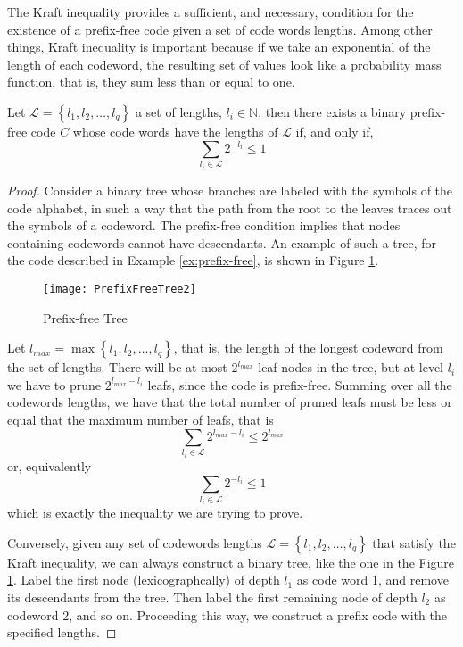 The Kraft inequality provides a sufficient, and necessary, condition for the existence of a prefix-free code given a set of code words lengths. Among other things, Kraft inequality is important because if we take an exponential of the length of each codeword, the resulting set of values look like a probability mass function, that is, they sum less than or equal to one.

\begin{theorem}
\label{th:Kraft-Inequality}
Let $\mathcal{L}=\left\{ l_{1},l_{2},\ldots,l_{q}\right\}$ a set of lengths, $l_{i}\in\mathbb{N}$, then there exists a binary prefix-free code $C$ whose code words have the lengths of $\mathcal{L}$ if, and only if,
\[
\sum_{l_{i}\in\mathcal{L}}2^{-l_{i}}\leq1
\]
\end{theorem}
\begin{proof}

Consider a binary tree whose branches are labeled with the symbols of the code alphabet, in such a way that the path from the root to the leaves traces out the symbols of a codeword. The prefix-free condition implies that nodes containing codewords cannot have descendants. An example of such a tree, for the code described in Example \ref{ex:prefix-free}, is shown in Figure \ref{fig:Prefix-Free-Tree}. 

\begin{figure}[h]
\centering\texttt{[image: PrefixFreeTree2]}
\caption{\label{fig:Prefix-Free-Tree}Prefix-free Tree}
\end{figure}

Let $l_{max}=\max \left\{ l_{1},l_{2},\ldots,l_{q}\right\}$, that is, the length of the longest codeword from the set of lengths. There will be at most $2^{l_{max}}$ leaf nodes in the tree, but at level $l_{i}$ we have to prune $2^{l_{max} - l_{i}}$ leafs, since the code is prefix-free. Summing over all the codewords lengths, we have that the total number of pruned leafs must be less or equal that the maximum number of leafs, that is
\[
\sum_{l_{i}\in\mathcal{L}}2^{l_{max}-l_{i}} \leq 2^{l_{max}}
\]
or, equivalently
\[
\sum_{l_{i}\in\mathcal{L}}2^{-l_{i}} \leq 1
\]
which is exactly the inequality we are trying to prove.

Conversely, given any set of codewords lengths $\mathcal{L}=\left\{ l_{1},l_{2},\ldots,l_{q}\right\}$ that satisfy the Kraft inequality, we can always construct a binary tree, like the one in the Figure \ref{fig:Prefix-Free-Tree}. Label the first node (lexicographcally) of depth $l_{1}$ as code word 1, and remove its descendants from the tree. Then label the first remaining node of depth $l_{2}$ as codeword 2, and so on. Proceeding this way, we construct a prefix code with the specified lengths.

\end{proof}

